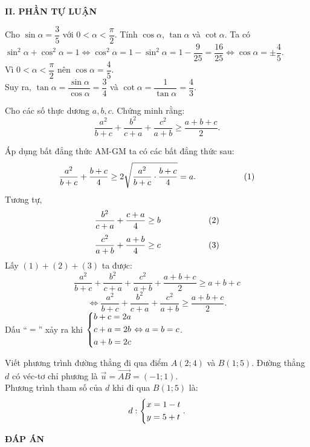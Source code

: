 \noindent\textbf{II. PHẦN TỰ LUẬN}
\begin{bt}%
	Cho $\sin \alpha=\dfrac{3}{5}$ với $0<\alpha<\dfrac{\pi}{2}$. Tính $\cos \alpha$, $\tan \alpha$ và $\cot \alpha$.
	\loigiai
	{
		Ta có $\sin^2 \alpha +\cos^2 \alpha =1 \Leftrightarrow \cos^2 \alpha =1-\sin^2 \alpha=1-\dfrac{9}{25}=\dfrac{16}{25} \Leftrightarrow \cos \alpha = \pm \dfrac{4}{5}$.\\
		Vì $0<\alpha<\dfrac{\pi}{2}$ nên $\cos \alpha =\dfrac{4}{5}$.\\
		Suy ra, $\tan \alpha=\dfrac{\sin \alpha}{\cos \alpha}=\dfrac{3}{4}$  và $\cot \alpha =\dfrac{1}{\tan \alpha}=\dfrac{4}{3}$.
	}
\end{bt}

\begin{bt}%
	Cho các số thực dương $a,b,c$. Chứng minh rằng:
	$$\dfrac{a^2}{b+c}+\dfrac{b^2}{c+a}+\dfrac{c^2}{a+b}\ge\dfrac{a+b+c}{2}.$$
	\loigiai
	{
		Áp dụng bất đẳng thức AM-GM ta có các bất đẳng thức sau:
		$$\dfrac{a^2}{b+c}+\dfrac{b+c}{4}\ge 2\sqrt{\dfrac{a^2}{b+c}\cdot\dfrac{b+c}{4}}=a. \hspace*{2cm}(1)$$
		Tương tự,
		$$\dfrac{b^2}{c+a}+\dfrac{c+a}{4}\ge b \hspace*{2cm}(2)$$
		$$\dfrac{c^2}{a+b}+\dfrac{a+b}{4}\ge c \hspace*{2cm}(3)$$
		Lấy $(1)+(2)+(3)$ ta được:
		$$\dfrac{a^2}{b+c}+\dfrac{b^2}{c+a}+\dfrac{c^2}{a+b}+\dfrac{a+b+c}{2}\ge a+b+c$$
		$$\Leftrightarrow \dfrac{a^2}{b+c}+\dfrac{b^2}{c+a}+\dfrac{c^2}{a+b}\ge\dfrac{a+b+c}{2}.$$
		Dấu ``$=$'' xảy ra khi $\left\{\begin{aligned}&b+c=2a\\&c+a=2b\\&a+b=2c\end{aligned}\right. \Leftrightarrow a=b=c$.
		
	}
\end{bt}

\begin{bt}%
	Viết phương trình đường thẳng đi qua điểm $A(2;4)$ và $B(1;5)$.
	\loigiai
	{
		Đường thẳng $d$ có véc-tơ chỉ phương là $\vec{u}=\vec{AB}=(-1;1)$.\\
		Phương trình tham số của $d$ khi đi qua $B(1;5)$ là:
		$$d:\left\{\begin{aligned}&x=1-t\\&y=5+t\end{aligned}\right..$$
	}
\end{bt}
\newpage
\begin{center}
	\textbf{ĐÁP ÁN}
\end{center}
\begin{multicols}{10}
	
\end{multicols}

